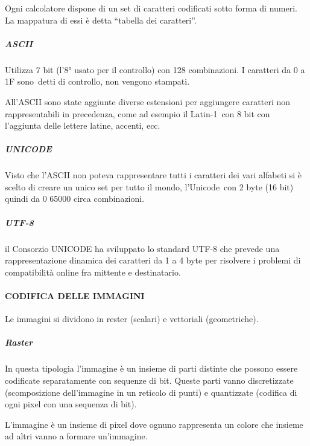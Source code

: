 \documentclass[
]{article}
\begin{document}
{Ogni calcolatore dispone di un set di caratteri codificati sotto forma
di numeri. La mappatura di essi è detta ``tabella dei caratteri''.}

{}

\subparagraph{\texorpdfstring{{ASCII}}{ASCII}}\label{h.9b0nk3eqtn99}

{Utilizza 7 bit (l'8° usato per il controllo) con 128 combinazioni. I
caratteri da 0 a }{1F sono}{~detti di controllo, non vengono stampati.}

{All'ASCII sono state aggiunte diverse estensioni per aggiungere
caratteri non rappresentabili in precedenza, come ad esempio il
}{Latin-1}{~con 8 bit con l'aggiunta delle lettere latine, accenti,
ecc.}

{}

\subparagraph{\texorpdfstring{{UNICODE}}{UNICODE}}\label{h.bd61yz7hzafz}

{Visto che l'ASCII non poteva rappresentare tutti i caratteri dei vari
alfabeti si è scelto di creare un unico set per tutto il mondo,
l'}{Unicode}{~con 2 byte (16 bit) quindi da 0 65000 circa combinazioni.}

{}

\subparagraph{\texorpdfstring{{UTF-8}}{UTF-8}}\label{h.f3aihekqylam}

{il Consorzio UNICODE ha sviluppato lo standard UTF-8 che prevede una
rappresentazione dinamica dei caratteri da 1 a 4 byte per risolvere i
problemi di compatibilità online fra mittente e destinatario.}

{}

{}

\paragraph{\texorpdfstring{{CODIFICA DELLE
IMMAGINI}}{CODIFICA DELLE IMMAGINI}}\label{h.7eoa772ihr4f}

{Le immagini si dividono in rester (scalari) e vettoriali
(geometriche).}

{}

\subparagraph{\texorpdfstring{{Raster}}{Raster}}\label{h.vxk6bc2xnlur}

{In questa tipologia l'immagine è un insieme di parti distinte che
possono essere codificate separatamente con sequenze di bit. Queste
parti vanno discretizzate (scomposizione dell'immagine in un reticolo di
punti) e quantizzate (codifica di ogni pixel con una sequenza di bit).}

{L'immagine è un insieme di pixel dove ognuno rappresenta un colore che
insieme ad altri vanno a formare un'immagine.}
\end{document}
